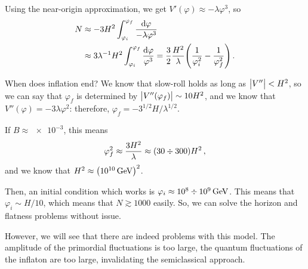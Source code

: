 \documentclass[main.tex]{subfiles}
\begin{document}
Using the near-origin approximation, we get \(V'(\varphi ) \approx - \lambda \varphi^3\), so 
%
\begin{align}
N &\approx  - 3 H^2 \int_{\varphi _i}^{\varphi _f} \frac{ \dd{\varphi }}{- \lambda \varphi^3}   \\
&\approx 3 \lambda^{-1} H^2 \int_{\varphi _i}^{\varphi _f} \frac{ \dd{\varphi }}{\varphi^3} = \frac{3}{2} \frac{H^2}{\lambda } \qty( \frac{1}{\varphi _i^2} - \frac{1}{\varphi_f^2})
\,.
\end{align}

When does inflation end?
We know that slow-roll holds as long as \(\abs{V''} < H^2\), so we can say that \(\varphi _f\) is determined by \(\abs{V''(\varphi _f)} \sim 10 H^2\), and we know that \(V''(\varphi ) = - 3 \lambda \varphi^2\): 
therefore, \(\varphi _f = - 3^{1/2} H / \lambda^{1/2}\). 

If \(B \approx \num{e-3}\), this means 
%
\begin{align}
\varphi _f^2 \approx \frac{3 H^2}{\lambda } \approx \qty(30 \divisionsymbol 300) H^2
\,,
\end{align}
%
and we know that \(H^2 \approx \qty(\SI{e10}{GeV})^2\).

Then, an initial condition which works is \(\varphi _i \approx \num{e8} \divisionsymbol \SI{e9}{GeV}\). 
This means that \(\varphi _i \sim H / 10\), which means that \(N \gtrsim 1000\) easily.
So, we can solve the horizon and flatness problems without issue. 

However, we will see that there are indeed problems with this model. 
The amplitude of the primordial fluctuations is too large, the quantum fluctuations of the inflaton are too large, invalidating the semiclassical approach. 
\end{document}
